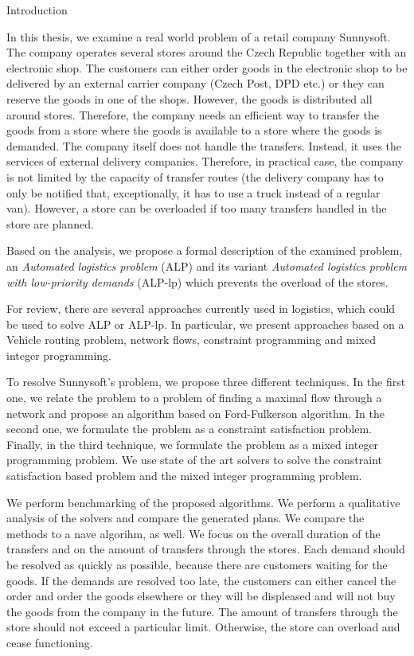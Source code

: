 \newpage
\chap Introduction

In this thesis, we examine a real world problem of a retail company Sunnysoft. The company operates several stores around the Czech Republic together with an electronic shop.
The customers can either order goods in the electronic shop to be delivered by an external carrier company (Czech Post, DPD etc.) or they can reserve the goods in one of the shops.
However, the goods is distributed all around stores. Therefore, the company needs an efficient way to transfer the goods from a store where the goods is available to a store where the goods
is demanded. The company itself does not handle the transfers. Instead, it uses the services of external delivery companies. Therefore, in practical case, the company is not limited by the capacity of transfer 
routes (the delivery company has to only be notified that, exceptionally, it has to use a truck instead of a regular van). However, a store can be overloaded if too many transfers handled in the store are planned. 

Based on the analysis, we propose a formal description of the examined problem, an {\em Automated logistics problem} (ALP) and its variant {\em Automated logistics problem with low-priority demands} (ALP-lp) which 
prevents the overload of the stores.

For review, there are several approaches currently used in logistics, which could be used to solve ALP or ALP-lp. In particular, we present approaches based on a Vehicle routing problem, network flows,
constraint programming and mixed integer programming.

To resolve Sunnysoft's problem, we propose three different techniques. In the first one, we relate the problem to a problem of finding a maximal flow through a network and propose an algorithm based
on Ford-Fulkerson algorithm. In the second one, we formulate the problem as a constraint satisfaction problem. Finally, in the third technique, we formulate the problem as a mixed integer programming 
problem. We use state of the art solvers to solve the constraint satisfaction based problem and the mixed integer programming problem.

We perform benchmarking of the proposed algorithms. We perform a qualitative analysis of the solvers and compare the generated plans. We compare the methods to a na\I ve algorihm, as well. We focus on the overall duration of the transfers and on the amount of transfers through the stores. Each demand should be resolved as quickly
as possible, because there are customers waiting for the goods. If the demands are resolved too late, the customers can either cancel the order and order the goods elsewhere or they will be
displeased and will not buy the goods from the company in the future. The amount of transfers through the store should not exceed a particular limit. Otherwise, the store can overload and cease functioning.

